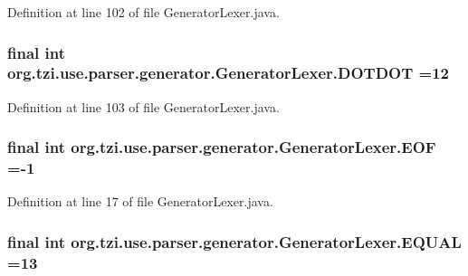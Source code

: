 Definition at line 102 of file Generator\-Lexer.\-java.

\hypertarget{classorg_1_1tzi_1_1use_1_1parser_1_1generator_1_1_generator_lexer_a245f817a6a4ce681826352e38fc462bf}{
\subsubsection[{D\-O\-T\-D\-O\-T}]{\setlength{\rightskip}{0pt plus 5cm}final int org.\-tzi.\-use.\-parser.\-generator.\-Generator\-Lexer.\-D\-O\-T\-D\-O\-T =12\hspace{0.3cm}{\ttfamily [static]}}}\label{classorg_1_1tzi_1_1use_1_1parser_1_1generator_1_1_generator_lexer_a245f817a6a4ce681826352e38fc462bf}


Definition at line 103 of file Generator\-Lexer.\-java.

\hypertarget{classorg_1_1tzi_1_1use_1_1parser_1_1generator_1_1_generator_lexer_a5fe7e43695c7611d5d5f645b0454448d}{
\subsubsection[{E\-O\-F}]{\setlength{\rightskip}{0pt plus 5cm}final int org.\-tzi.\-use.\-parser.\-generator.\-Generator\-Lexer.\-E\-O\-F =-\/1\hspace{0.3cm}{\ttfamily [static]}}}\label{classorg_1_1tzi_1_1use_1_1parser_1_1generator_1_1_generator_lexer_a5fe7e43695c7611d5d5f645b0454448d}


Definition at line 17 of file Generator\-Lexer.\-java.

\hypertarget{classorg_1_1tzi_1_1use_1_1parser_1_1generator_1_1_generator_lexer_a21cdb02acedd830b7dcc72b62930f5c5}{
\subsubsection[{E\-Q\-U\-A\-L}]{\setlength{\rightskip}{0pt plus 5cm}final int org.\-tzi.\-use.\-parser.\-generator.\-Generator\-Lexer.\-E\-Q\-U\-A\-L =13\hspace{0.3cm}{\ttfamily [static]}}}\label{classorg_1_1tzi_1_1use_1_1parser_1_1generator_1_1_generator_lexer_a21cdb02acedd830b7dcc72b62930f5c5}


